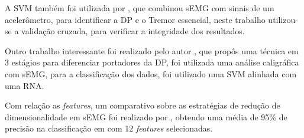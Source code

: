 A SVM também foi utilizada por , que combinou sEMG com sinais de um acelerômetro, para identificar a DP e o Tremor essencial, neste trabalho utilizou-se a validação cruzada, para verificar a integridade dos resultados.

Outro trabalho interessante foi realizado pelo autor , que propôs uma técnica em 3 estágios para diferenciar portadores da DP, foi utilizada uma análise caligráfica com sEMG, para a classificação dos dados, foi utilizado uma SVM alinhada com uma RNA.

Com relação as \textit{features}, um comparativo sobre as estratégias de redução de dimensionalidade em sEMG foi realizado por , obtendo uma média de 95\% de precisão na classificação em com 12 \textit{features} selecionadas. 